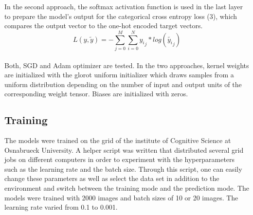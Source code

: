 \documentclass[12pt,letterpaper]{article}
\begin{document}
In the second approach, the softmax activation function is used in the last layer to prepare the model’s output for the categorical cross entropy loss (3), which compares the output vector to the one-hot encoded target vectors. 
\begin{equation}
L(y,\tilde{y}) = -\sum_{j=0}^M \sum_{i=0}^N
{{y_i}_j}*log({\tilde{y_i}_j})
\end{equation}
\\
Both, SGD and Adam optimizer are tested. In the two approaches, kernel weights are initialized with the glorot uniform initializer which draws samples from a uniform distribution depending on the number of input and output units of the corresponding weight tensor. Biases are initialized with zeros.


\subsection{Training}
The models were trained on the grid of the institute of Cognitive Science at Osnabrueck University. A helper script was written that distributed several grid jobs on different computers in order to experiment with the hyperparameters such as the learning rate and the batch size. Through this script, one can easily change these parameters as well as select the data set in addition to the environment and switch between the training mode and the prediction mode. The models were trained with 2000 images and batch sizes of 10 or 20 images. The learning rate varied from 0.1 to 0.001.
\end{document}
